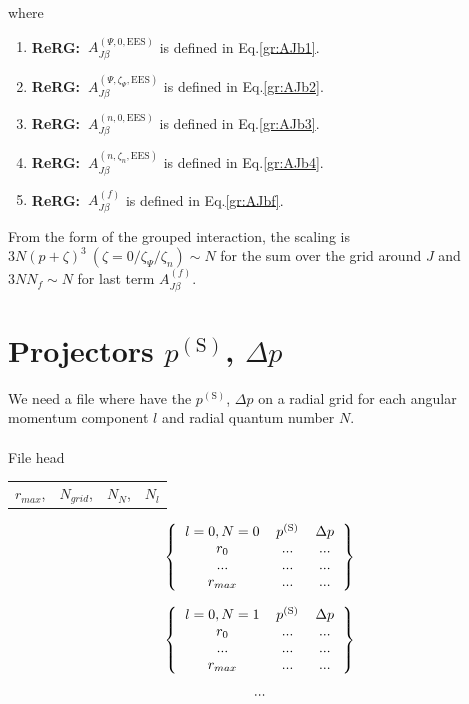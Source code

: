 \documentclass[paper=a4, fontsize=11pt]{article} %
\numberwithin{equation}{section} %
\numberwithin{figure}{section} %
\numberwithin{table}{section} %
\newcommand{\rS}{{\mathrm{S}}}
\newcommand{\rEES}{{\mathrm{EES}}}
\newcommand{\pz}{{(p+\zeta)^3}}
\newcommand{\ReRG}{{{\bf ReRG:\ }}}
\begin{document}
where
\begin{enumerate}
\item \ReRG $A_{J\beta}^{(\Psi,0,\rEES)}$ is defined in Eq.\eqref{gr:AJb1}.
\item \ReRG $A_{J\beta}^{(\Psi,\zeta_\Psi,\rEES)}$ is defined in  Eq.\eqref{gr:AJb2}.
\item \ReRG $A_{J\beta}^{(n,0,\rEES)}$ is defined in Eq.\eqref{gr:AJb3}.
\item \ReRG $A_{J\beta}^{(n,\zeta_n,\rEES)}$ is defined in Eq.\eqref{gr:AJb4}.
\item \ReRG $A_{J\beta}^{(f)}$ is defined in Eq.\eqref{gr:AJbf}.
\end{enumerate}

From the form of the grouped interaction, the scaling is $3 N \pz\ (\zeta = 0/\zeta_\Psi/\zeta_n) \sim N$ for the sum over the grid around $J$ and $3 N N_f \sim N$ for last term $A_{J\beta}^{(f)}$.




\newpage
\section{Projectors $p^{(\rS)}$, $\Delta p$}\label{App:proj}
We need a file where have the $p^{(\rS)}$, $\Delta p$ on a radial grid for each angular momentum component $l$ and radial quantum number $N$. \\ \\
File head\\

\begin{tabular}{cccc}
  $r_{max}$, & $N_{grid}$, & $N_N$, & $N_l$ \\
  \end{tabular}

\[ 
\left \{
  \begin{tabular}{ccc}
  $l=0, N=0$ & $p^{(\rS)}$ & $\Delta p$ \\
  $r_0$ & ... & ... \\
  ... & ... & ... \\
  $r_{max}$ & ... & ... \\
  \end{tabular}
\right \}
\]

\[ 
\left \{
  \begin{tabular}{ccc}
  $l=0, N=1$ & $p^{(\rS)}$ & $\Delta p$ \\
  $r_0$ & ... & ... \\
  ... & ... & ... \\
  $r_{max}$ & ... & ... \\
  \end{tabular}
\right \}
\]
\[
\begin{tabular}{c}
  ... \\
  \end{tabular}
  \]
  
\end{document}
